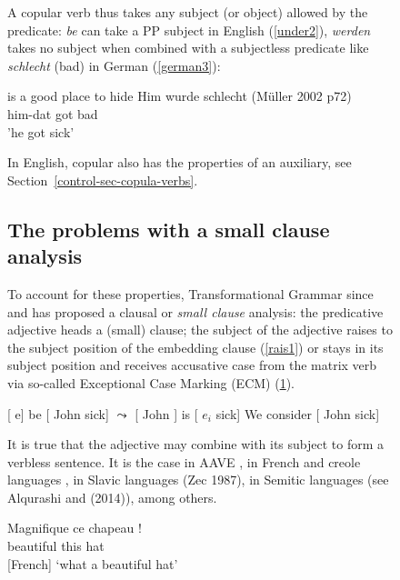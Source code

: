 \documentclass[output=paper
                ,modfonts
                ,nonflat
	        ,collection
	        ,collectionchapter
	        ,collectiontoclongg
 	        ,biblatex
                ,babelshorthands
                ,newtxmath
                ,draftmode
                ,colorlinks, citecolor=brown
]{./langsci/langscibook}
\begin{document}
\begin{figure}
A copular verb thus takes any subject (or object) allowed by the predicate: \emph{be} can take a PP subject in English (\ref{under2}), \emph{werden} takes no subject when combined with a subjectless predicate like \emph{schlecht} (bad) in German (\ref{german3}):

\begin{exe}
\ex 
\begin{xlist}
 is a good place to hide \label{under2}
\ex Him wurde schlecht (Müller 2002 p72) \label{german3}\\
him-dat got bad\\
'he got sick'
\end{xlist}	
\end{exe}

 In English, copular  also has the properties of an auxiliary, see Section~\ref{control-sec-copula-verbs}.

\subsection{The problems with a small clause analysis}

To account for these properties, Transformational Grammar since \citet{Stowell1983} and
\citet{Chomsky1986} has proposed a clausal or \emph{small clause} analysis: the predicative
adjective heads a (small) clause; the subject of the adjective raises to the subject position of the
embedding clause (\ref{rais1}) or stays in its subject position and receives accusative case from
the matrix verb via so-called Exceptional Case Marking (ECM) (\ref{ecm}).


\begin{exe}
\ex  {}[ e] be [ John sick] $\leadsto$  [ John ] is  [ $e_{i}$ sick] \label{rais1}
\ex   We consider [ John sick] \label{ecm}
\end{exe}

It is true that the adjective may combine with its subject to form a verbless sentence. It is the
case in AAVE \citep{Bender2001a}, in French \citet{Laurens2008} and creole languages
\citet{HenriandAbeille2007}, in Slavic languages (Zec 1987), in Semitic languages (see
Alqurashi and (2014)), among others. 

\begin{exe}
\ex \gll Magnifique ce chapeau !\\
beautiful this hat\\\hfill{[French]}
\glt `what a beautiful hat'
\end{exe}


\end{figure}
\end{document}
